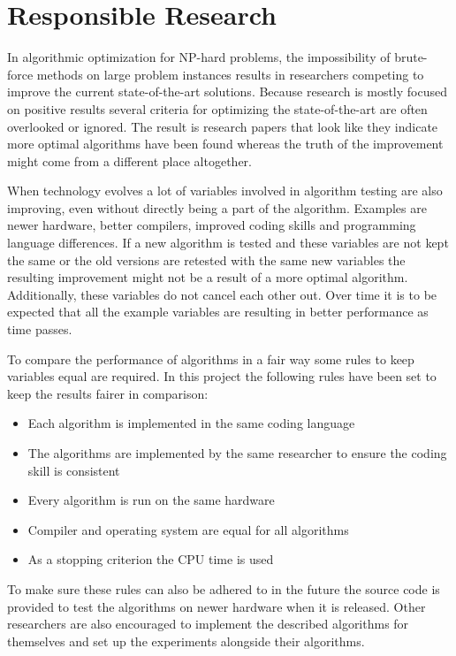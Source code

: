 \section{Responsible Research} \label{section:responsible_research}
In algorithmic optimization for NP-hard problems, the impossibility of brute-force methods on large problem instances results in researchers competing to improve the current state-of-the-art solutions. Because research is mostly focused on positive results several criteria for optimizing the state-of-the-art are often overlooked or ignored. The result is research papers that look like they indicate more optimal algorithms have been found whereas the truth of the improvement might come from a different place altogether.

When technology evolves a lot of variables involved in algorithm testing are also improving, even without directly being a part of the algorithm. Examples are newer hardware, better compilers, improved coding skills and programming language differences. If a new algorithm is tested and these variables are not kept the same or the old versions are retested with the same new variables the resulting improvement might not be a result of a more optimal algorithm. Additionally, these variables do not cancel each other out. Over time it is to be expected that all the example variables are resulting in better performance as time passes.

To compare the performance of algorithms in a fair way some rules to keep variables equal are required. In this project the following rules have been set to keep the results fairer in comparison: 
\begin{itemize}
\item Each algorithm is implemented in the same coding language
\item The algorithms are implemented by the same researcher to ensure the coding skill is consistent
\item Every algorithm is run on the same hardware
\item Compiler and operating system are equal for all algorithms
\item As a stopping criterion the CPU time is used
\end{itemize}
To make sure these rules can also be adhered to in the future the source code is provided to test the algorithms on newer hardware when it is released. Other researchers are also encouraged to implement the described algorithms for themselves and set up the experiments alongside their algorithms.


